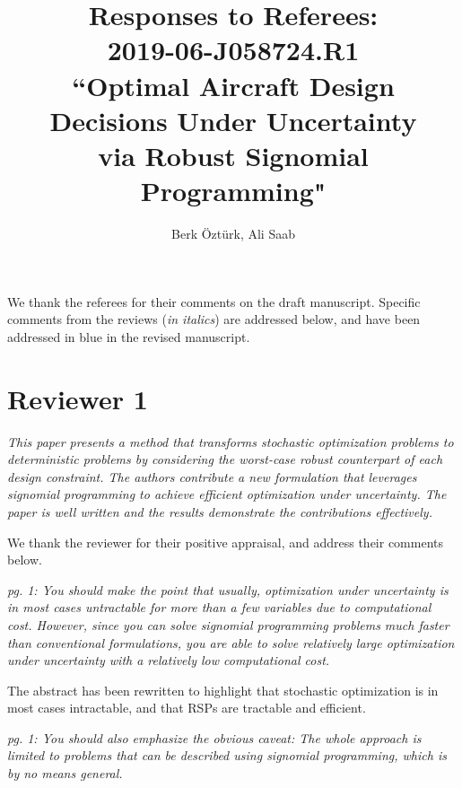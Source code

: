 \documentclass[11pt]{article}
\begin{document}
    \title{Responses to Referees: \\
    2019-06-J058724.R1 \\
    ``Optimal Aircraft Design \\ Decisions Under Uncertainty \\
    via Robust Signomial Programming"}

    \author{Berk \"Ozt\"urk, Ali Saab}

    \maketitle

    We thank the referees for their comments on the draft manuscript.
    Specific comments from the reviews (\textit{in italics}) are addressed below, and
    have been addressed {\color{blue} in blue} in the revised manuscript.

    \section{Reviewer 1}

    \textit{This paper presents a method that transforms stochastic optimization problems to
    deterministic problems by considering the worst-case robust counterpart of each design constraint.
    The authors contribute a new formulation that leverages signomial programming to achieve
    efficient optimization under uncertainty. The paper is well written and the results
    demonstrate the contributions effectively.}

    We thank the reviewer for their positive appraisal, and address their comments below.
    \bigskip

    \textit{pg. 1: You should make the point that usually, optimization under uncertainty is
    in most cases untractable for more than a few variables due to computational cost.
    However, since you can solve signomial programming problems much faster than conventional formulations,
    you are able to solve relatively large optimization under uncertainty with a relatively low computational cost.}

    The abstract has been rewritten to highlight that stochastic optimization is in most cases
    intractable, and that RSPs are tractable and efficient.
    \bigskip

    \textit{pg. 1: You should also emphasize the obvious caveat: The whole approach
    is limited to problems that can be described using signomial programming, which is by no means general.}
\end{document}
